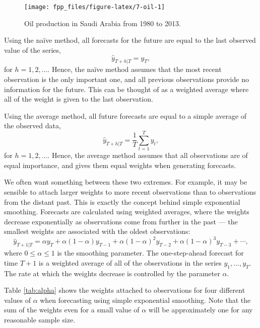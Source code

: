 \documentclass[]{book}
\begin{document}
\begin{figure}

{\centering \texttt{[image: fpp\_files/figure-latex/7-oil-1]} 

}

\caption{Oil production in Saudi Arabia from 1980 to 2013.}\label{fig:7-oil}
\end{figure}

Using the naïve method, all forecasts for the future are equal to the last observed value of the series,
\[
  \hat{y}_{T+h|T} = y_{T},
\]
for \(h=1,2,\dots\). Hence, the naïve method assumes that the most recent observation is the only important one, and all previous observations provide no information for the future. This can be thought of as a weighted average where all of the weight is given to the last observation.

Using the average method, all future forecasts are equal to a simple average of the observed data,
\[
  \hat{y}_{T+h|T} = \frac1T \sum_{t=1}^T y_t,
\]
for \(h=1,2,\dots\). Hence, the average method assumes that all observations are of equal importance, and gives them equal weights when generating forecasts.

We often want something between these two extremes. For example, it may be sensible to attach larger weights to more recent observations than to observations from the distant past. This is exactly the concept behind simple exponential smoothing. Forecasts are calculated using weighted averages, where the weights decrease exponentially as observations come from further in the past --- the smallest weights are associated with the oldest observations:
\begin{equation}
  \hat{y}_{T+1|T} = \alpha y_T + \alpha(1-\alpha) y_{T-1} + \alpha(1-\alpha)^2 y_{T-2}+ \alpha(1-\alpha)^3 y_{T-3}+\cdots,   \label{eq:7-ses}
\end{equation}
where \(0 \le \alpha \le 1\) is the smoothing parameter. The one-step-ahead forecast for time \(T+1\) is a weighted average of all of the observations in the series \(y_1,\dots,y_T\). The rate at which the weights decrease is controlled by the parameter \(\alpha\).

Table \ref{tab:alpha} shows the weights attached to observations for four different values of \(\alpha\) when forecasting using simple exponential smoothing. Note that the sum of the weights even for a small value of \(\alpha\) will be approximately one for any reasonable sample size.
\end{document}
